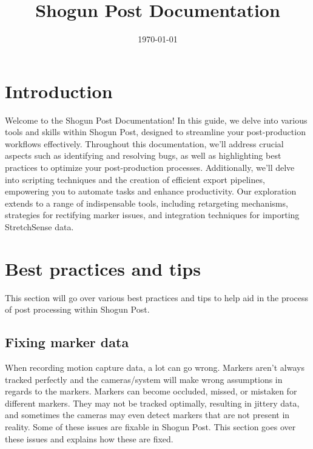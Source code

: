 \documentclass{uva-inf-article}
\title{Shogun Post Documentation}
\date{\today}
\begin{document}
\maketitle


\tableofcontents
\newpage
\section{Introduction}
Welcome to the Shogun Post Documentation! In this guide, we delve into various tools and skills within Shogun Post, designed to streamline your post-production workflows effectively. Throughout this documentation, we'll address crucial aspects such as identifying and resolving bugs, as well as highlighting best practices to optimize your post-production processes. Additionally, we'll delve into scripting techniques and the creation of efficient export pipelines, empowering you to automate tasks and enhance productivity.
Our exploration extends to a range of indispensable tools, including retargeting mechanisms, strategies for rectifying marker issues, and integration techniques for importing StretchSense data.

\section{Best practices and tips}
This section will go over various best practices and tips to help aid in the process of post processing within Shogun Post.

\subsection{Fixing marker data}
When recording motion capture data, a lot can go wrong. Markers aren't always tracked perfectly and the cameras/system will make wrong assumptions in regards to the markers. Markers can become occluded, missed, or mistaken for different markers. They may not be tracked optimally, resulting in jittery data, and sometimes the cameras may even detect markers that are not present in reality. Some of these issues are fixable in Shogun Post. This section goes over these issues and explains how these are fixed.
\end{document}
